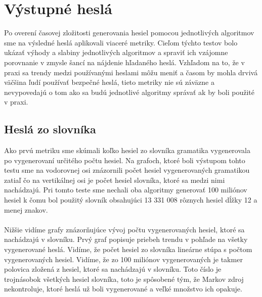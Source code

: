 \paragraph{}


\section{Výstupné heslá}
Po overení časovej zložitosti generovania hesiel pomocou jednotlivých algoritmov sme na výsledné heslá aplikovali viaceré metriky. Cieľom týchto testov bolo ukázať výhody a slabiny jednotlivých algoritmov a spraviť ich vzájomne porovnanie v zmysle šancí na nájdenie hľadaného heslá. Vzhľadom na to, že v praxi sa trendy medzi používanými heslami môžu meniť a časom by mohla drvivá väčšina ľudí používať bezpečné heslá, tieto metriky nie sú záväzne a nevypovedajú o tom ako sa budú jednotlivé algoritmy správať ak by boli použité v praxi.

\subsection{Heslá zo slovníka}
Ako prvú metriku sme skúmali koľko hesiel zo slovníka gramatika vygenerovala po vygenerovaní určitého počtu hesiel. Na grafoch, ktoré boli výstupom tohto testu sme na vodorovnej osi znázornili počet hesiel vygenerovaných gramatikou zatiaľ čo na vertikálnej osi je počet hesiel slovníka, ktoré sa medzi nimi nachádzajú. Pri tomto teste sme nechali oba algoritmy generovať 100 miliónov hesiel k čomu bol použitý slovník obsahujúci 13 331 008 rôznych hesiel dĺžky 12 a menej znakov.

\paragraph{}
Nižšie vidíme grafy znázorňujúce vývoj počtu vygenerovaných hesiel, ktoré sa nachádzajú v slovníku. Prvý graf popisuje priebeh trendu v pohľade na všetky vygenerované heslá. Vidíme, že počet hesiel zo slovníka lineárne stúpa s počtom vygenerovaných hesiel. Vidíme, že zo 100 miliónov vygenerovaných je takmer polovica zložená z hesiel, ktoré sa nachádzajú v slovníku. Toto číslo je trojnásobok všetkých hesiel slovníka, toto je spôsobené tým, že Markov zdroj nekontroluje, ktoré heslá už boli vygenerované a veľké množstvo ich opakuje.

